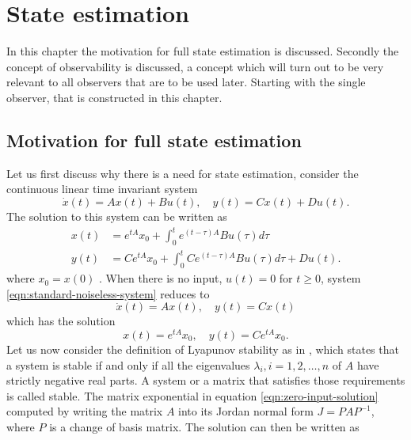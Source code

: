 \section{State estimation}\label{ch:state-estimation}
In this chapter the motivation for full state estimation is discussed. Secondly the concept of observability is discussed, a concept which will turn out to be very relevant to all observers that are to be used later. Starting with the single observer, that is constructed in this chapter.

\subsection{Motivation for full state estimation}
Let us first discuss why there is a need for state estimation, consider the continuous linear time invariant system
\begin{equation}\label{eqn:standard-noiseless-system}
    \dot{x}(t) = Ax(t) + Bu(t), \quad y(t) = Cx(t) + Du(t).
\end{equation}
The solution to this system can be written as
\begin{equation*}
    \begin{split}
        x(t) &= e^{tA}x_{0} + \int_{0}^{t}e^{(t-\tau)A}Bu(\tau)d\tau \\
        y(t) &= Ce^{tA}x_{0} + \int_{0}^{t}Ce^{(t-\tau)A}Bu(\tau)d\tau + Du(t).
    \end{split}
\end{equation*}
where $x_0 = x(0)$ \cite[Equation. 6.4]{Hespanha2018LinearTheory}. When there is no input, $u(t)=0$ for $t \geq 0$, system \eqref{eqn:standard-noiseless-system} reduces to
\begin{equation*}
    \dot{x}(t) = Ax(t), \quad y(t) = Cx(t)
\end{equation*}
which has the solution
\begin{equation}\label{eqn:zero-input-solution}
    x(t) = e^{tA}x_0, \quad y(t) = Ce^{tA}x_0.
\end{equation}
Let us now consider the definition of Lyapunov stability as in \cite[Theorem 8.2]{Hespanha2018LinearTheory}, which states that a system is stable if and only if all the eigenvalues $\lambda_i,i=1,2,\dots,n$ of $A$ have strictly negative real parts. A system or a matrix that satisfies those requirements is called stable. The matrix exponential in equation \eqref{eqn:zero-input-solution} computed by writing the matrix $A$ into its Jordan normal form $J=PAP^{-1}$, where $P$ is a change of basis matrix. The solution can then be written as 
